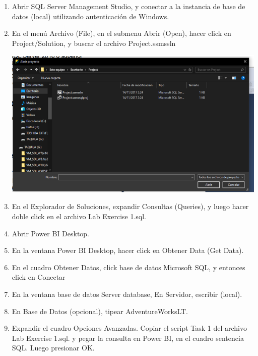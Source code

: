 \documentclass[12pt,letterpaper]{article}
\begin{document}
\begin{enumerate}
    \item Abrir SQL Server Management Studio, y conectar a la instancia de base de datos (local) utilizando autenticación de Windows.
    
    
    \item En el menú Archivo (File), en el submenu Abrir (Open), hacer click en Project/Solution, y buscar el archivo Project.ssmssln
    
    \begin{center}
	\includegraphics[width=13cm]{./Imagenes/1}
	\end{center}
    
    
    \item En el Explorador de Soluciones, expandir Consultas (Queries), y luego hacer doble click en el archivo Lab Exercise 1.sql.   
    \item Abrir Power BI Desktop.
    
    
    \item En la ventana Power BI Desktop, hacer click en Obtener Data (Get Data).

	
    \item En el cuadro Obtener Datos, click base de datos Microsoft SQL, y entonces click en Conectar
    
    \item En la ventana base de datos Server database, En Servidor, escribir (local).
    
    \item En Base de Datos (opcional), tipear AdventureWorksLT.
    
    
    \item Expandir el cuadro Opciones Avanzadas. Copiar el script Task 1 del archivo Lab Exercise 1.sql. y pegar la consulta en Power BI, en el cuadro sentencia SQL. Luego presionar OK.
    

\end{enumerate}
\end{document}
